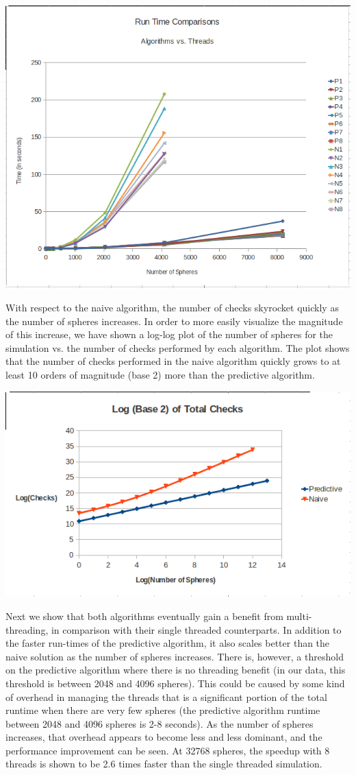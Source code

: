 \documentclass[conference]{IEEEtran}
\begin{document}
\begin{center}
	\includegraphics[width=.45\textwidth]{runtime_comparison.png}
\end{center}

With respect to the naive algorithm, the number of checks skyrocket quickly as the number of spheres increases.  In order to more easily visualize the magnitude of this increase, we have shown a log-log plot of the number of spheres for the simulation vs. the number of checks performed by each algorithm.  The plot shows that the number of checks performed in the naive algorithm quickly grows to at least 10 orders of magnitude (base 2) more than the predictive algorithm.

\begin{center}
	\includegraphics[width=.45\textwidth]{log_total_checks_comparison.png}
\end{center}

Next we show that both algorithms eventually gain a benefit from multi-threading, in comparison with their single threaded counterparts.  In addition to the faster run-times of the predictive algorithm, it also scales better than the naive solution as the number of spheres increases.  There is, however, a threshold on the predictive algorithm where there is no threading benefit (in our data, this threshold is between 2048 and 4096 spheres).  This could be caused by some kind of overhead in managing the threads that is a significant portion of the total runtime when there are very few spheres (the predictive algorithm runtime between 2048 and 4096 spheres is 2-8 seconds).  As the number of spheres increases, that overhead appears to become less and less dominant, and the performance improvement can be seen.  At 32768 spheres, the speedup with 8 threads is shown to be 2.6 times faster than the single threaded simulation.
\end{document}
